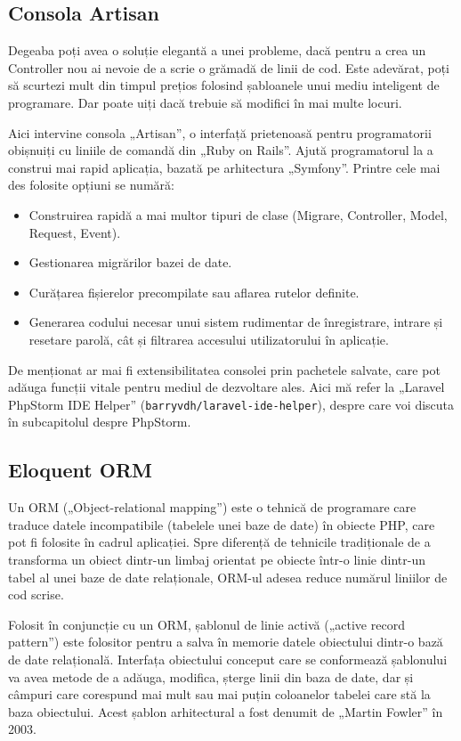 	\subsection{Consola Artisan}


		Degeaba poți avea o soluție elegantă a unei probleme, dacă pentru a crea un Controller nou ai nevoie de a scrie o grămadă de linii de cod.
		Este adevărat, poți să scurtezi mult din timpul prețios folosind șabloanele unui mediu inteligent de programare.
		Dar poate uiți dacă trebuie să modifici în mai multe locuri.

		Aici intervine consola „Artisan”, o interfață prietenoasă pentru programatorii obișnuiți cu liniile de comandă din „Ruby on Rails”.
		Ajută programatorul la a construi mai rapid aplicația, bazată pe arhitectura „Symfony”.
		Printre cele mai des folosite opțiuni se numără:
		\begin{itemize}
			\item Construirea rapidă a mai multor tipuri de clase (Migrare, Controller, Model, Request, Event).
			\item Gestionarea migrărilor bazei de date.
			\item Curățarea fișierelor precompilate sau aflarea rutelor definite.
			\item Generarea codului necesar unui sistem rudimentar de înregistrare, intrare și resetare parolă, cât și filtrarea accesului utilizatorului în aplicație.
		\end{itemize}
		De menționat ar mai fi extensibilitatea consolei prin pachetele salvate, care pot adăuga funcții vitale pentru mediul de dezvoltare ales.
		Aici mă refer la „Laravel PhpStorm IDE Helper” (\verb|barryvdh/laravel-ide-helper|), despre care voi discuta în subcapitolul despre PhpStorm.
	\subsection{Eloquent ORM}

		Un ORM („Object-relational mapping”) este o tehnică de programare care traduce datele incompatibile (tabelele unei baze de date) în obiecte PHP, care pot fi folosite în cadrul aplicației.
		Spre diferență de tehnicile tradiționale de a transforma un obiect dintr-un limbaj orientat pe obiecte într-o linie dintr-un tabel al unei baze de date relaționale, ORM-ul adesea reduce numărul liniilor de cod scrise.\cite{orm}

		Folosit în conjuncție cu un ORM, șablonul de linie activă („active record pattern”) este folositor pentru a salva în memorie datele obiectului dintr-o bază de date relațională.
		Interfața obiectului conceput care se conformează șablonului va avea metode de a adăuga, modifica, șterge linii din baza de date, dar și câmpuri care corespund mai mult sau mai puțin coloanelor tabelei care stă la baza obiectului.
		Acest șablon arhitectural a fost denumit de „Martin Fowler” în 2003.
		\cite{active_record}

